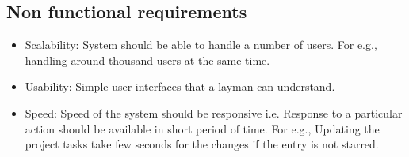 \begin{itemize}
\subsection{Non functional requirements}
\begin{itemize} 
\item Scalability: System should be able to handle a number of users. 
For e.g., handling around thousand users at the same time.
\item Usability: Simple user interfaces that a layman can understand.
\item Speed: Speed of the system should be responsive i.e. Response to
 a particular action should be available in short period of time. For 
e.g., Updating the project tasks take few seconds for the changes if 
the entry is not starred.
\end{itemize}
\end{itemize}
